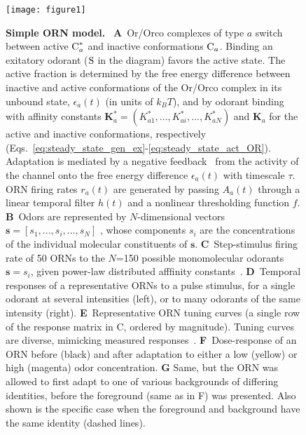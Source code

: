 \documentclass[9pt,lineno]{elife}
\begin{document}
\begin{figure}
	\begin{fullwidth}
		\texttt{[image: figure1]}
		\caption{\footnotesize{
			\textbf{Simple ORN model.}~\citep{srinivas_elife} \textbf{A}~Or/Orco complexes of type $a$ switch between active $\textup{C}^*_a$ and inactive conformations $\textup{C}_a$. Binding an exitatory odorant ($\textup{S}$ in the diagram) favors the active state. The active fraction is determined by the free energy difference between inactive and active conformations of the Or/Orco complex in its unbound state, $\epsilon_a(t)$ (in units of $k_B T$), and by odorant binding with affinity constants $\mathbf{K}^*_a=(K^*_{a1},...,K^*_{ai},...,K^*_{aN})$ and $\mathbf{K}_a$ for the active and inactive conformations, respectively (Eqs.~\ref{eq:steady_state_gen_ex}-\ref{eq:steady_state_act_OR}). Adaptation is mediated by a negative feedback~\citep{nagel_wilson_biophysical} from the activity of the channel onto the free energy difference $\epsilon_a(t)$ with timescale $\tau$. ORN firing rates $r_a(t)$ are generated by passing $A_a(t)$ through a linear temporal filter $h(t)$ and a nonlinear thresholding function $f$.
			\textbf{B}~Odors are represented by $N$-dimensional vectors $\mathbf{s}=[s_1,...,s_i,...,s_N]$ , whose components $s_i$ are the concentrations of  the individual molecular constituents  of $\mathbf s$. 
			\textbf{C}~Step-stimulus firing rate of 50 ORNs to the $N$=150 possible monomolecular odorants $\mathbf s = s_i$, given  power-law distributed afffinity constants~\citep{si2017invariances}.
			\textbf{D}~Temporal responses of a representative ORNs to a pulse stimulus, for a single odorant at several intensities (left), or to many odorants of the same intensity (right).
			\textbf{E}~Representative ORN tuning curves (a single row of the response matrix in C, ordered by magnitude). Tuning curves are diverse, mimicking measured responses~\citep{hallem_carlson}.
			{\color{blue} \textbf{F}~Dose-response of an ORN before (black) and after adaptation to either a low (yellow) or high (magenta) odor concentration.  
			\textbf{G} Same, but the ORN was allowed to first adapt to one of various backgrounds of differing identities, before the foreground (same as in F) was presented. Also shown is the specific case when the foreground and background have the same identity (dashed lines).}}
			}
		\label{fig:tuning_curves}
	\end{fullwidth}
\end{figure}
\end{document}
